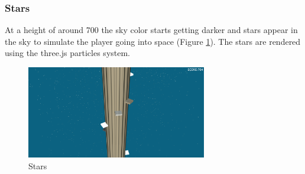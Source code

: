 \documentclass[12pt]{article}
\begin{document}
\subsubsection{Stars}
At a height of around 700 the sky color starts getting darker and stars appear in the sky to simulate the player going into space (Figure \ref{fig:stars}). The stars are rendered using the three.js particles system.

\begin{figure}[h]
\centering
\includegraphics[width=0.7\textwidth]{stars}
\caption{Stars}
\label{fig:stars}
\end{figure}
\end{document}
